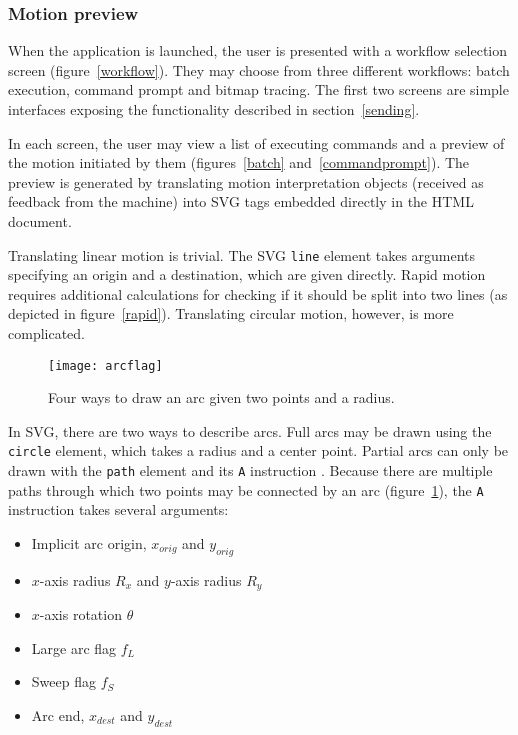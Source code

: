\clearpage
\subsubsection{Motion preview}

When the application is launched, the user is presented with a workflow
selection screen (figure~\ref{workflow}). They may choose from three different
workflows: batch execution, command prompt and bitmap tracing. The first two
screens are simple interfaces exposing the functionality described in
section~\ref{sending}.

In each screen, the user may view a list of executing commands and a preview
of the motion initiated by them (figures~\ref{batch} and~\ref{commandprompt}).
The preview is generated by translating motion interpretation objects
(received as feedback from the machine) into SVG tags embedded directly in the
HTML document.

Translating linear motion is trivial. The SVG \texttt{line} element takes
arguments specifying an origin and a destination, which are given directly.
Rapid motion requires additional calculations for checking if it should be
split into two lines (as depicted in figure~\ref{rapid}). Translating circular
motion, however, is more complicated.

\begin{figure}[ht]
    \begin{center}
        \texttt{[image: arcflag]}
        \caption{Four ways to draw an arc given two points and a radius.}
        \label{arcflag}
    \end{center}
\end{figure}

In SVG, there are two ways to describe arcs. Full arcs may be drawn using the
\texttt{circle} element, which takes a radius and a center point. Partial
arcs can only be drawn with the \texttt{path} element and its \texttt{A}
instruction \cite{circles}. Because there are multiple paths through which two
points may be connected by an arc (figure~\ref{arcflag}), the \texttt{A}
instruction takes several arguments:

\begin{itemize}
    \item Implicit arc origin, $x_{orig}$ and $y_{orig}$
    \item $x$-axis radius $R_x$ and $y$-axis radius $R_y$
    \item $x$-axis rotation $\theta$
    \item Large arc flag $f_L$
    \item Sweep flag $f_S$
    \item Arc end, $x_{dest}$ and $y_{dest}$
\end{itemize}

